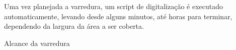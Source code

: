 Uma vez planejada a varredura, um script de digitalização é executado automaticamente, levando desde alguns minutos, até horas para terminar, dependendo da largura da área a ser coberta.



Alcance da varredura


